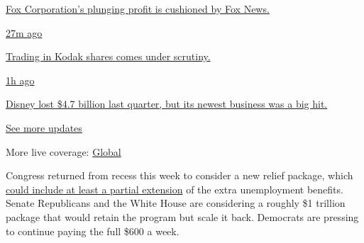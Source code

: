 \href{https://www.nytimes3xbfgragh.onion/live/2020/08/04/business/stock-market-today-coronavirus?action=click\&pgtype=Article\&state=default\&region=MAIN_CONTENT_1\&context=storylines_live_updates\#fox-corporations-plunging-profit-is-cushioned-by-fox-news}{Fox
Corporation's plunging profit is cushioned by Fox News.}

\href{https://www.nytimes3xbfgragh.onion/live/2020/08/04/business/stock-market-today-coronavirus?action=click\&pgtype=Article\&state=default\&region=MAIN_CONTENT_1\&context=storylines_live_updates\#trading-in-kodak-shares-comes-under-scrutiny}{27m
ago}

\href{https://www.nytimes3xbfgragh.onion/live/2020/08/04/business/stock-market-today-coronavirus?action=click\&pgtype=Article\&state=default\&region=MAIN_CONTENT_1\&context=storylines_live_updates\#trading-in-kodak-shares-comes-under-scrutiny}{Trading
in Kodak shares comes under scrutiny.}

\href{https://www.nytimes3xbfgragh.onion/live/2020/08/04/business/stock-market-today-coronavirus?action=click\&pgtype=Article\&state=default\&region=MAIN_CONTENT_1\&context=storylines_live_updates\#disney-lost-4-7-billion-last-quarter-but-its-newest-business-was-a-big-hit}{1h
ago}

\href{https://www.nytimes3xbfgragh.onion/live/2020/08/04/business/stock-market-today-coronavirus?action=click\&pgtype=Article\&state=default\&region=MAIN_CONTENT_1\&context=storylines_live_updates\#disney-lost-4-7-billion-last-quarter-but-its-newest-business-was-a-big-hit}{Disney
lost \$4.7 billion last quarter, but its newest business was a big hit.}

\href{https://www.nytimes3xbfgragh.onion/live/2020/08/04/business/stock-market-today-coronavirus?action=click\&pgtype=Article\&state=default\&region=MAIN_CONTENT_1\&context=storylines_live_updates}{See
more updates}

More live coverage:
\href{https://www.nytimes3xbfgragh.onion/2020/08/04/world/coronavirus-cases.html?action=click\&pgtype=Article\&state=default\&region=MAIN_CONTENT_1\&context=storylines_live_updates}{Global}

Congress returned from recess this week to consider a new relief
package, which
\href{https://www.nytimes3xbfgragh.onion/2020/07/20/us/politics/congress-coronavirus-aid-package.html}{could
include at least a partial extension} of the extra unemployment
benefits. Senate Republicans and the White House are considering a
roughly \$1 trillion package that would retain the program but scale it
back. Democrats are pressing to continue paying the full \$600 a week.

